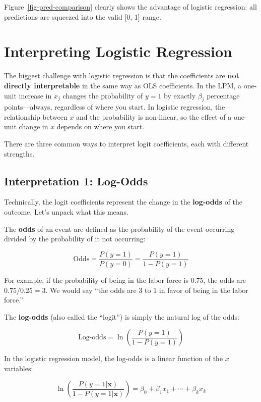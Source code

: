 \documentclass[
  letterpaper,
  DIV=11,
  numbers=noendperiod]{scrreprt}
\begin{document}
Figure~\ref{fig-pred-comparison} clearly shows the advantage of logistic
regression: all predictions are squeezed into the valid {[}0, 1{]}
range.

\section{Interpreting Logistic
Regression}\label{interpreting-logistic-regression}

The biggest challenge with logistic regression is that the coefficients
are \textbf{not directly interpretable} in the same way as OLS
coefficients. In the LPM, a one-unit increase in \(x_j\) changes the
probability of \(y = 1\) by exactly \(\beta_j\) percentage
points---always, regardless of where you start. In logistic regression,
the relationship between \(x\) and the probability is non-linear, so the
effect of a one-unit change in \(x\) depends on where you start.

There are three common ways to interpret logit coefficients, each with
different strengths.

\subsection{Interpretation 1: Log-Odds}\label{interpretation-1-log-odds}

Technically, the logit coefficients represent the change in the
\textbf{log-odds} of the outcome. Let's unpack what this means.

The \textbf{odds} of an event are defined as the probability of the
event occurring divided by the probability of it not occurring:

\[
\text{Odds} = \frac{P(y = 1)}{P(y = 0)} = \frac{P(y = 1)}{1 - P(y = 1)}
\]

For example, if the probability of being in the labor force is 0.75, the
odds are \(0.75 / 0.25 = 3\). We would say ``the odds are 3 to 1 in
favor of being in the labor force.''

The \textbf{log-odds} (also called the ``logit'') is simply the natural
log of the odds:

\[
\text{Log-odds} = \ln\left(\frac{P(y = 1)}{1 - P(y = 1)}\right)
\]

In the logistic regression model, the log-odds is a linear function of
the \(x\) variables:

\[
\ln\left(\frac{P(y = 1 | \mathbf{x})}{1 - P(y = 1 | \mathbf{x})}\right) = \beta_0 + \beta_1 x_1 + \cdots + \beta_k x_k
\]
\end{document}
